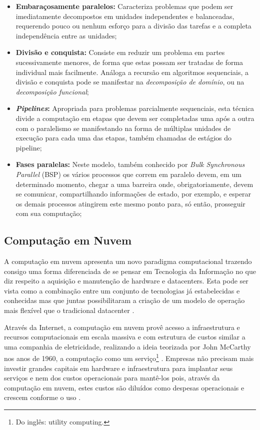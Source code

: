 \documentclass[english,brazilian]{UNISINOSmonografia} %
\begin{document}
\begin{itemize}
	\item \textbf{Embaraçosamente paralelos:}
	Caracteriza problemas que podem ser imediatamente decompostos em unidades independentes e balanceadas, requerendo pouco ou nenhum esforço para a divisão das tarefas e a completa independência entre as unidades;
	
	\item \textbf{Divisão e conquista:} 
	Consiste em reduzir um problema em partes sucessivamente menores, de forma que estas possam ser tratadas de forma individual mais facilmente. 
	Análoga a recursão em algoritmos sequenciais, a divisão e conquista pode se manifestar na \textit{decomposição de domínio}, ou na \textit{decomposição funcional};
	
	\item \textbf{\textit{Pipelines}:}
	Apropriada para problemas parcialmente sequenciais, esta técnica divide a computação em etapas que devem ser completadas uma após a outra com o paralelismo se manifestando na forma de múltiplas unidades de execução para cada uma das etapas, também chamadas de estágios do pipeline;
	
	\item \textbf{Fases paralelas:}
	Neste modelo, também conhecido por \textit{Bulk Synchronous Parallel} (BSP) os vários processos que correm em paralelo devem, em um determinado momento, chegar a uma barreira onde, obrigatoriamente, devem se comunicar, compartilhando informações de estado, por exemplo, e esperar os demais processos atingirem este mesmo ponto para, só então, prosseguir com sua computação;
\end{itemize}

\subsection{Computação em Nuvem}
\label{sec:cloud}


A computação em nuvem apresenta um novo paradigma computacional trazendo consigo uma forma diferenciada de se pensar em Tecnologia da Informação no que diz respeito a aquisição e manutenção de hardware e datacenters. 
Esta pode ser vista como a combinação entre um conjunto de tecnologias já estabelecidas e conhecidas mas que juntas possibilitaram a criação de um modelo de operação mais flexível que o tradicional datacenter \cite{Zhang2010}.

Através da Internet, a computação em nuvem provê acesso a infraestrutura e recursos computacionais em escala massiva e com estrutura de custos similar a uma companhia de eletricidade, realizando a ideia teorizada por John McCarthy nos anos de 1960, a computação como um serviço\footnote{
	Do inglês: utility computing.
}
\cite{Zhang2010,Suleiman2012}.
Empresas não precisam mais investir grandes capitais em hardware e infraestrutura para implantar seus serviços e nem dos custos operacionais para mantê-los pois, através da computação em nuvem, estes custos são diluídos como despesas operacionais e crescem conforme o uso \cite{Martin2011}.
\end{document}
